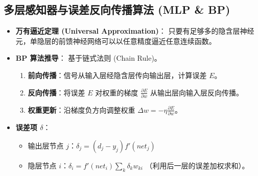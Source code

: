 \documentclass[a4paper, 11pt]{ctexart}
\begin{document}
\subsection{多层感知器与误差反向传播算法 (MLP \& BP)}
\begin{itemize}
    \item \textbf{万有逼近定理 (Universal Approximation)}：
    只要有足够多的隐含层神经元，单隐层的前馈神经网络可以以任意精度逼近任意连续函数。
    \item \textbf{BP 算法推导}：
    基于链式法则 (Chain Rule)。
    \begin{enumerate}
        \item \textbf{前向传播}：信号从输入层经隐含层传向输出层，计算误差 $E$。
        \item \textbf{反向传播}：将误差 $E$ 对权重的梯度 $\frac{\partial E}{\partial w}$ 从输出层向输入层反向传播。
        \item \textbf{权重更新}：沿梯度负方向调整权重 $\Delta w = -\eta \frac{\partial E}{\partial w}$。
    \end{enumerate}
    \item \textbf{误差项 $\delta$}：
    \begin{itemize}
        \item 输出层节点 $j$：$\delta_j = (d_j - y_j) f'(net_j)$
        \item 隐层节点 $i$：$\delta_i = f'(net_i) \sum_k \delta_k w_{ki}$ （利用后一层的误差加权求和）。
    \end{itemize}
\end{itemize}
\end{document}
